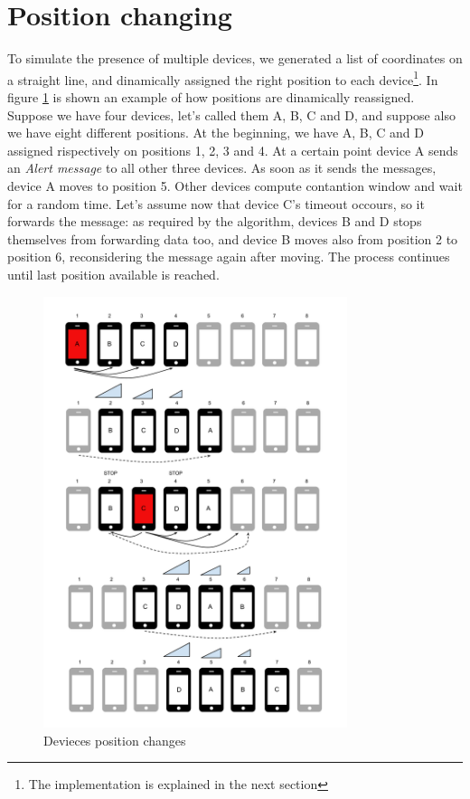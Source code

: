 \section{Position changing}
\label{sec:position_change}

To simulate the presence of multiple devices, we generated a list of coordinates on a straight line, and dinamically assigned the right position to each device\footnote{The implementation is explained in the next section}. In figure \ref{fig:positions} is shown an example of how positions are dinamically reassigned. Suppose we have four devices, let's called them A, B, C and D, and suppose also we have eight different positions. At the beginning, we have A, B, C and D assigned rispectively on positions 1, 2, 3 and 4. At a certain point device A sends an \emph{Alert message} to all other three devices. As soon as it sends the messages, device A moves to position 5. Other devices compute contantion window and wait for a random time. Let's assume now that device C's timeout occours, so it forwards the message: as required by the algorithm, devices B and D stops themselves from forwarding data too, and device B moves also from position 2 to position 6, reconsidering the message again after moving. The process continues until last position available is reached. 

\begin{figure}[htbp]
\centering
\includegraphics[width=3.5in]{imgs/Positions_1.pdf}
\caption{Devieces position changes}
\label{fig:positions}
\end{figure}
